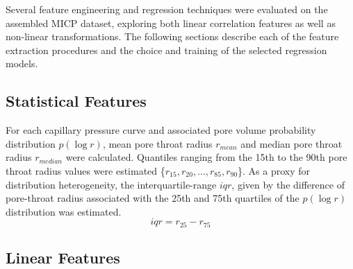 \documentclass[english,msc,numbers]{coppe}
\begin{document}
  Several feature engineering and regression techniques were evaluated on the assembled MICP dataset, exploring both linear correlation features as well as non-linear transformations. The following sections describe each of the feature extraction procedures and the choice and training of the selected regression models.
  
  \hypertarget{statistical-features}{%
  \subsection{Statistical Features}\label{statistical-features}}
  
  For each capillary pressure curve and associated pore volume probability distribution \(p(\log{r})\), mean pore throat radius \(r_{mean}\) and median pore throat radius \(r_{median}\) were calculated. Quantiles ranging from the 15th to the 90th pore throat radius values were estimated \{\(r_{15},r_{20},...,r_{85},r_{90}\)\}. As a proxy for distribution heterogeneity, the interquartile-range \(iqr\), given by the difference of pore-throat radius associated with the 25th and 75th quartiles of the \(p(\log{r})\) distribution was estimated.
  \begin{equation} 
    iqr = r_{25} - r_{75}
    \label{eq:iqr}
  \end{equation}
  \hypertarget{linear-features}{%
  \subsection{Linear Features}\label{linear-features}}
  
\end{document}
